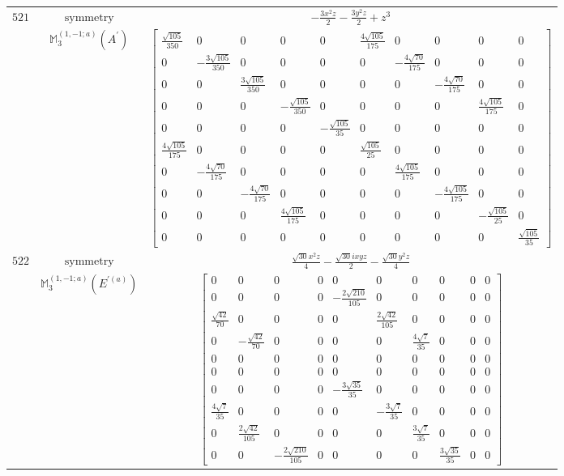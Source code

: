 \documentclass[fleqn,8pt,landscape]{jsarticle}
\begin{document}
\begin{longtable}{ccc}
$ 521 $ & $ \text{symmetry} $ & $ - \frac{3 x^{2} z}{2} - \frac{3 y^{2} z}{2} + z^{3} $ \\
$  $ & $ \mathbb{M}_{3}^{(1,-1;a)}(A^{\prime}) $ & $ \begin{bmatrix} \frac{\sqrt{105}}{350} & 0 & 0 & 0 & 0 & \frac{4 \sqrt{105}}{175} & 0 & 0 & 0 & 0 \\ 0 & - \frac{3 \sqrt{105}}{350} & 0 & 0 & 0 & 0 & - \frac{4 \sqrt{70}}{175} & 0 & 0 & 0 \\ 0 & 0 & \frac{3 \sqrt{105}}{350} & 0 & 0 & 0 & 0 & - \frac{4 \sqrt{70}}{175} & 0 & 0 \\ 0 & 0 & 0 & - \frac{\sqrt{105}}{350} & 0 & 0 & 0 & 0 & \frac{4 \sqrt{105}}{175} & 0 \\ 0 & 0 & 0 & 0 & - \frac{\sqrt{105}}{35} & 0 & 0 & 0 & 0 & 0 \\ \frac{4 \sqrt{105}}{175} & 0 & 0 & 0 & 0 & \frac{\sqrt{105}}{25} & 0 & 0 & 0 & 0 \\ 0 & - \frac{4 \sqrt{70}}{175} & 0 & 0 & 0 & 0 & \frac{4 \sqrt{105}}{175} & 0 & 0 & 0 \\ 0 & 0 & - \frac{4 \sqrt{70}}{175} & 0 & 0 & 0 & 0 & - \frac{4 \sqrt{105}}{175} & 0 & 0 \\ 0 & 0 & 0 & \frac{4 \sqrt{105}}{175} & 0 & 0 & 0 & 0 & - \frac{\sqrt{105}}{25} & 0 \\ 0 & 0 & 0 & 0 & 0 & 0 & 0 & 0 & 0 & \frac{\sqrt{105}}{35} \end{bmatrix} $ \\ \hline
$ 522 $ & $ \text{symmetry} $ & $ \frac{\sqrt{30} x^{2} z}{4} - \frac{\sqrt{30} i x y z}{2} - \frac{\sqrt{30} y^{2} z}{4} $ \\
$  $ & $ \mathbb{M}_{3}^{(1,-1;a)}(E^{\prime(a)}) $ & $ \begin{bmatrix} 0 & 0 & 0 & 0 & 0 & 0 & 0 & 0 & 0 & 0 \\ 0 & 0 & 0 & 0 & - \frac{2 \sqrt{210}}{105} & 0 & 0 & 0 & 0 & 0 \\ \frac{\sqrt{42}}{70} & 0 & 0 & 0 & 0 & \frac{2 \sqrt{42}}{105} & 0 & 0 & 0 & 0 \\ 0 & - \frac{\sqrt{42}}{70} & 0 & 0 & 0 & 0 & \frac{4 \sqrt{7}}{35} & 0 & 0 & 0 \\ 0 & 0 & 0 & 0 & 0 & 0 & 0 & 0 & 0 & 0 \\ 0 & 0 & 0 & 0 & 0 & 0 & 0 & 0 & 0 & 0 \\ 0 & 0 & 0 & 0 & - \frac{3 \sqrt{35}}{35} & 0 & 0 & 0 & 0 & 0 \\ \frac{4 \sqrt{7}}{35} & 0 & 0 & 0 & 0 & - \frac{3 \sqrt{7}}{35} & 0 & 0 & 0 & 0 \\ 0 & \frac{2 \sqrt{42}}{105} & 0 & 0 & 0 & 0 & \frac{3 \sqrt{7}}{35} & 0 & 0 & 0 \\ 0 & 0 & - \frac{2 \sqrt{210}}{105} & 0 & 0 & 0 & 0 & \frac{3 \sqrt{35}}{35} & 0 & 0 \end{bmatrix} $ \\ \hline

\end{longtable}
\end{document}
